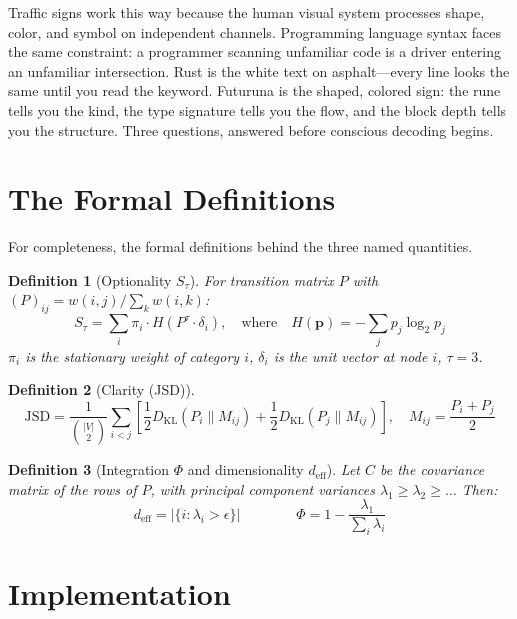 \documentclass[11pt,a4paper]{article}
\newtheorem{definition}{Definition}
\newcommand{\Stau}{S_\tau}
\newcommand{\deff}{d_{\mathrm{eff}}}
\begin{document}
Traffic signs work this way because the human visual system processes shape, color, and symbol on independent channels. Programming language syntax faces the same constraint: a programmer scanning unfamiliar code is a driver entering an unfamiliar intersection. Rust is the white text on asphalt---every line looks the same until you read the keyword. Futuruna is the shaped, colored sign: the rune tells you the kind, the type signature tells you the flow, and the block depth tells you the structure. Three questions, answered before conscious decoding begins.

\section{The Formal Definitions}

For completeness, the formal definitions behind the three named quantities.

\begin{definition}[Optionality $\Stau$]
For transition matrix $P$ with $(P)_{ij} = w(i,j) / \sum_k w(i,k)$:
\[
\Stau = \sum_i \pi_i \cdot H(P^\tau \cdot \delta_i), \quad \text{where} \quad H(\mathbf{p}) = -\sum_j p_j \log_2 p_j
\]
$\pi_i$ is the stationary weight of category $i$, $\delta_i$ is the unit vector at node $i$, $\tau = 3$.
\end{definition}

\begin{definition}[Clarity (JSD)]
\[
\mathrm{JSD} = \frac{1}{\binom{|V|}{2}} \sum_{i < j} \left[ \frac{1}{2} D_{\mathrm{KL}}(P_i \| M_{ij}) + \frac{1}{2} D_{\mathrm{KL}}(P_j \| M_{ij}) \right], \quad M_{ij} = \frac{P_i + P_j}{2}
\]
\end{definition}

\begin{definition}[Integration $\Phi$ and dimensionality $\deff$]
Let $C$ be the covariance matrix of the rows of $P$, with principal component variances $\lambda_1 \geq \lambda_2 \geq \dots$ Then:
\[
\deff = |\{ i : \lambda_i > \epsilon \}| \qquad \qquad \Phi = 1 - \frac{\lambda_1}{\sum_i \lambda_i}
\]
\end{definition}

\section{Implementation}
\end{document}
